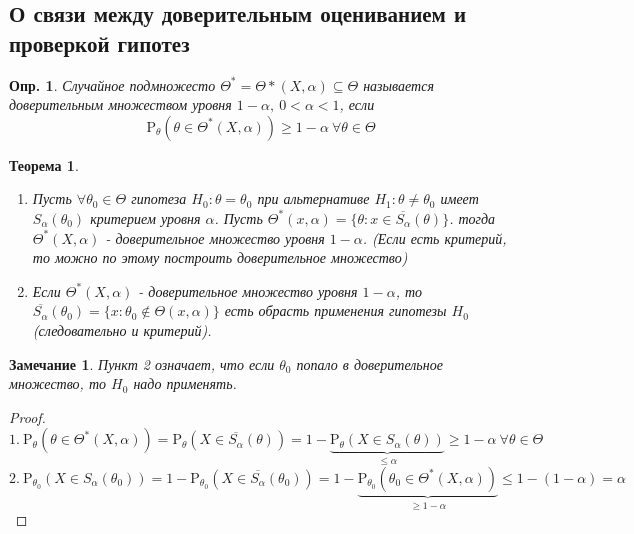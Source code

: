 \documentclass[12pt]{article}
\newtheorem{definition}{Опр.}
\newtheorem{remark}{Замечание}
\theoremstyle{basic_theorem}
\newtheorem{theorem}{Теорема}
\theoremstyle{name_theorem}
\def\P{ \mathrm{P} }
\begin{document}
\subsection*{О связи между доверительным оцениванием и проверкой гипотез}

\begin{definition}
    Случайное подмножесто \(\Theta^*=\Theta*(X,\alpha)\subseteq\Theta\)
    называется доверительным множеством уровня \(1-\alpha,\ 0<\alpha<1\),
    если
    \[\P_\theta(\theta\in\Theta^*(X,\alpha))\geq 1-\alpha\ \forall\theta\in\Theta\]
\end{definition}
\begin{theorem} \label{th::trusted_set_eq_plausibility_test}
    \begin{enumerate}
        \item Пусть \(\forall\theta_0\in\Theta\) гипотеза \(H_0:\theta=\theta_0\)
        при альтернативе \(H_1:\theta\neq\theta_0\) имеет \(S_\alpha(\theta_0)\)
        критерием уровня \(\alpha\). Пусть \(\Theta^*(x,\alpha) = \{\theta:x\in\overline{S_\alpha}(\theta)\}\).
        тогда \(\Theta^*(X,\alpha)\) - доверительное множество уровня \(1-\alpha\).
        (Если есть критерий, то можно по этому  построить доверительное множество)

        \item Если \(\Theta^*(X,\alpha)\) - доверительное множество уровня \(1-\alpha\),
        то \(\overline{S_\alpha}(\theta_0)=\{x:\theta_0\notin\Theta(x,\alpha)\}\)
        есть обрасть применения гипотезы \(H_0\) (следовательно и критерий).
    \end{enumerate}
\end{theorem}
\begin{remark} \label{hyp::accept_HO}
    Пункт 2 означает, что если \(\theta_0\) попало в доверительное множество,
    то \(H_0\) надо применять.
\end{remark}
\begin{proof}
    \[1.\ \P_\theta(\theta\in\Theta^*(X,\alpha)) = \P_\theta(X\in\overline{S_\alpha}(\theta)) = 1 - \underbrace{\P_\theta(X\in S_\alpha(\theta))}_{\leq\alpha}\geq 1-\alpha\ \forall\theta\in\Theta\]
    \[2.\ \P_{\theta_0}(X\in S_\alpha(\theta_0)) = 1-\P_{\theta_0}(X\in \overline{S_\alpha}(\theta_0))=
        1-\underbrace{\P_{\theta_0}(\theta_0\in\Theta^*(X,\alpha))}_{\geq 1-\alpha} \leq 1-(1-\alpha) = \alpha\]
\end{proof}
\end{document}
